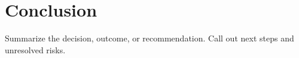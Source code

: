\section{Conclusion}

Summarize the decision, outcome, or recommendation. Call out next steps and unresolved risks.
